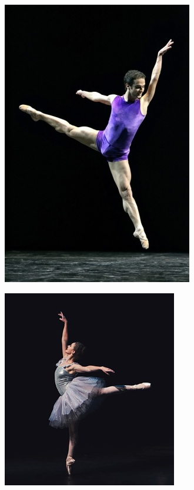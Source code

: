 \begin{figure}[htpb!]
\includegraphics[width=.5\textwidth]{./imgs/art15a.jpg}
\end{figure}
\begin{figure}[htpb!]
\includegraphics[width=.5\textwidth]{./imgs/art15b.png}
\end{figure}

